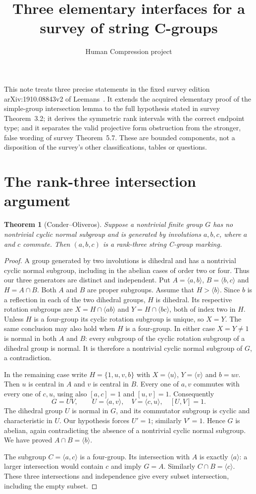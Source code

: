 \documentclass[11pt,a4paper]{article}
\title{Three elementary interfaces for a survey of string C-groups}
\author{Human Compression project}\date{}
\newtheorem{theorem}{Theorem}\newtheorem{proposition}[theorem]{Proposition}
\newcommand{\gen}[1]{\langle #1\rangle}
\begin{document}
\maketitle
This note treats three precise statements in the fixed survey edition
arXiv:1910.08843v2 of Leemans~\cite{survey}. It extends the acquired elementary
proof of the simple-group intersection lemma to the full hypothesis stated
in survey Theorem~3.2; it derives the symmetric rank intervals with the correct
endpoint type; and it separates the valid projective form obstruction from
the stronger, false wording of survey Theorem~5.7. These are bounded components,
not a disposition of the survey's other classifications, tables or questions.

\section{The rank-three intersection argument}
\begin{theorem}[Conder--Oliveros]\label{three}
Suppose a nontrivial finite group $G$ has no nontrivial cyclic normal subgroup
and is generated by involutions $a,b,c$, where $a$ and $c$ commute. Then
$(a,b,c)$ is a rank-three string C-group marking.
\end{theorem}
\begin{proof}
A group generated by two involutions is dihedral and has a nontrivial cyclic
normal subgroup, including in the abelian cases of order two or four. Thus
our three generators are distinct and independent. Put
$A=\gen{a,b}$, $B=\gen{b,c}$ and $H=A\cap B$. Both $A$ and $B$ are proper
subgroups. Assume that $H>\gen b$. Since $b$ is a reflection in each of the
two dihedral groups, $H$ is dihedral. Its respective rotation subgroups are
$X=H\cap\gen{ab}$ and $Y=H\cap\gen{bc}$, both of index two in $H$.
Unless $H$ is a four-group its cyclic rotation subgroup is unique, so $X=Y$.
The same conclusion may also hold when $H$ is a four-group. In either case
$X=Y\ne1$ is normal in both $A$ and $B$: every subgroup of the cyclic
rotation subgroup of a dihedral group is normal. It is therefore a nontrivial
cyclic normal subgroup of $G$, a contradiction.

In the remaining case write $H=\{1,u,v,b\}$ with $X=\gen u$, $Y=\gen v$
and $b=uv$. Then $u$ is central in $A$ and $v$ is central in $B$. Every
one of $a,v$ commutes with every one of $c,u$, using also $[a,c]=1$ and
$[u,v]=1$. Consequently
\[
 G=UV,\qquad U=\gen{a,v},\quad V=\gen{c,u},\quad [U,V]=1.
\]
The dihedral group $U$ is normal in $G$, and its commutator subgroup is
cyclic and characteristic in $U$. Our hypothesis forces $U'=1$; similarly
$V'=1$. Hence $G$ is abelian, again contradicting the absence of a
nontrivial cyclic normal subgroup. We have proved $A\cap B=\gen b$.

The subgroup $C=\gen{a,c}$ is a four-group. Its intersection with $A$
is exactly $\gen a$: a larger intersection would contain $c$ and imply
$G=A$. Similarly $C\cap B=\gen c$. These three intersections and
independence give every subset intersection, including the empty subset.
\end{proof}
\end{document}
